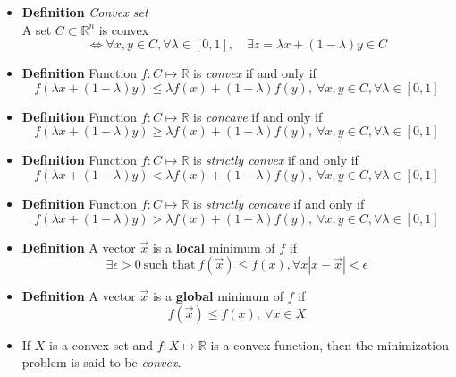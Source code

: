 \documentclass[11pt,a4paper]{article}
\begin{document}
\begin{itemize}
    \item \textbf{Definition} \emph{Convex set} \\
        A set $C \subset \mathbb{R}^n$ is convex
        \[
            \iff \forall x, y \in C, \forall \lambda \in [0, 1], \quad
            \exists z = \lambda x + (1 - \lambda) y \in C
        \]

    \item \textbf{Definition} Function $f : C \mapsto \mathbb{R}$ is \emph{convex} if and only if
        \[
            f(\lambda x + (1 - \lambda) y) \leq \lambda f(x) + (1-\lambda) f(y), \
            \forall x, y \in C, \forall \lambda \in [0, 1]
        \]

    \item \textbf{Definition} Function $f : C \mapsto \mathbb{R}$ is \emph{concave} if and only if
        \[
            f(\lambda x + (1 - \lambda) y) \geq \lambda f(x) + (1-\lambda) f(y), \
            \forall x, y \in C, \forall \lambda \in [0, 1]
        \]

    \item \textbf{Definition} Function $f : C \mapsto \mathbb{R}$ is \emph{strictly convex} if and only if
        \[
            f(\lambda x + (1 - \lambda) y) < \lambda f(x) + (1-\lambda) f(y), \
            \forall x, y \in C, \forall \lambda \in [0, 1]
        \]

    \item \textbf{Definition} Function $f : C \mapsto \mathbb{R}$ is \emph{strictly concave} if and only if
        \[
            f(\lambda x + (1 - \lambda) y) > \lambda f(x) + (1-\lambda) f(y), \
            \forall x, y \in C, \forall \lambda \in [0, 1]
        \]

    \item \textbf{Definition} A vector $\vec{x}$ is a \textbf{local} minimum of $f$ if
        \[
            \exists \epsilon > 0 \ \text{such that} \
            f(\vec{x}) \leq f(x), \forall x |x - \vec{x}| < \epsilon
        \]

    \item \textbf{Definition} A vector $\vec{x}$ is a \textbf{global} minimum of $f$ if
        \[
            f(\vec{x}) \leq f(x), \ \forall x \in X
        \]

    \item If $X$ is a convex set and $f : X \mapsto \mathbb{R}$ is a convex function,
        then the minimization problem is said to be \emph{convex}.


\end{itemize}
\end{document}
